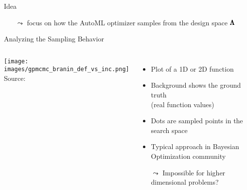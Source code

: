 \begin{frame}[c,fragile]{Idea}

\begin{center}
\scalebox{0.9}{
	\let\oldpause=\pause \def\pause{} 
	
	\let\pause=\oldpause
}
\end{center}

\begin{itemize}
	\item[$\leadsto$] focus on how the AutoML optimizer samples from the design space $\pmb{\Lambda}$ 
\end{itemize}

\end{frame}
\begin{frame}[c]{Analyzing the Sampling Behavior}


\begin{columns}
	
	\begin{center}
		\texttt{[image: images/gpmcmc\_branin\_def\_vs\_inc.png]}\\
		Source: 
	\end{center}
	
	
	\begin{itemize}
		\item Plot of a 1D or 2D function
		\pause
		\item Background shows the ground truth\\
		 (real function values)
		\pause
		\item Dots are sampled points in the search space
		\pause
		\item Typical approach in Bayesian Optimization community
		\pause
		\medskip
		\item[$\leadsto$] Impossible for higher dimensional problems?
	\end{itemize}

\end{columns}

\end{frame}
